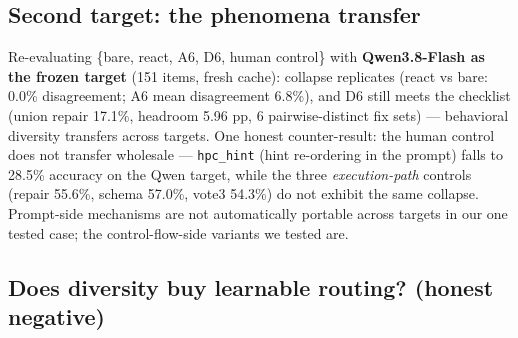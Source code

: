 \subsection{Second target: the phenomena
transfer}\label{second-target-the-phenomena-transfer}

Re-evaluating \{bare, react, A6, D6, human control\} with
\textbf{Qwen3.8-Flash as the frozen target} (151 items, fresh cache):
collapse replicates (react vs bare: 0.0\% disagreement; A6 mean
disagreement 6.8\%), and D6 still meets the checklist (union repair 17.1\%, headroom 5.96 pp,
6 pairwise-distinct fix sets) --- behavioral diversity transfers across
targets. One honest counter-result: the human
control does not transfer wholesale --- \texttt{hpc\_hint} (hint
re-ordering in the prompt) falls to 28.5\% accuracy on the Qwen target, while the three
\emph{execution-path} controls (repair 55.6\%, schema 57.0\%, vote3
54.3\%) do not exhibit the same collapse. Prompt-side mechanisms are not
automatically portable across targets in our one tested case; the
control-flow-side variants we tested are.
\subsection{Does diversity buy learnable routing? (honest
negative)}\label{does-diversity-buy-learnable-routing-honest-negative}

